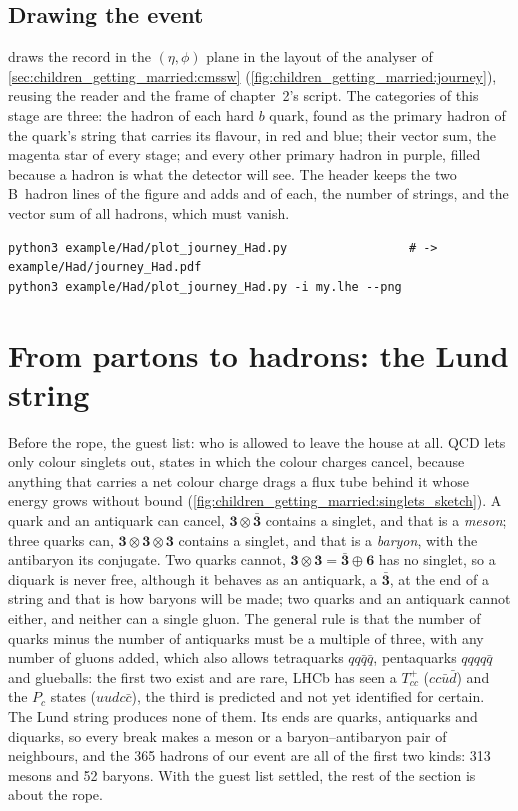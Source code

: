 \subsection{Drawing the event}

 draws the record in the $(\eta,\phi)$
plane in the layout of the \CMSSW analyser of
\cref{sec:children_getting_married:cmssw} (\cref{fig:children_getting_married:journey}),
reusing the reader and the frame of chapter~2's script. The categories of
this stage are three: the hadron of each hard $b$ quark, found as the
primary hadron of the quark's string that carries its flavour, in red and
blue; their vector sum, the magenta star of every stage; and every other
primary hadron in purple, filled because a hadron is what the detector will
see. The header keeps the two B~hadron lines of the \CMSSW figure and adds
\xE and \xpt of each, the number of strings, and the vector sum of all
hadrons, which must vanish.
\begin{verbatim}
python3 example/Had/plot_journey_Had.py                 # -> example/Had/journey_Had.pdf
python3 example/Had/plot_journey_Had.py -i my.lhe --png
\end{verbatim}

\section{From partons to hadrons: the Lund string}
\label{sec:children_getting_married:from_partons_to_hadrons_the_lund_string}

Before the rope, the guest list: who is allowed to leave the house at all.
QCD lets only colour singlets out, states in which the colour charges
cancel, because anything that carries a net colour charge drags a flux
tube behind it whose energy grows without bound
(\cref{fig:children_getting_married:singlets_sketch}). A quark and an
antiquark can cancel, $\mathbf3\otimes\bar{\mathbf3}$ contains a singlet,
and that is a \emph{meson}; three quarks can, $\mathbf3\otimes\mathbf3\otimes\mathbf3$
contains a singlet, and that is a \emph{baryon}, with the antibaryon its
conjugate. Two quarks cannot, $\mathbf3\otimes\mathbf3=\bar{\mathbf3}\oplus\mathbf6$
has no singlet, so a diquark is never free, although it behaves as an
antiquark, a $\bar{\mathbf3}$, at the end of a string and that is how
baryons will be made; two quarks and an antiquark cannot either, and
neither can a single gluon. The general rule is that the number of quarks
minus the number of antiquarks must be a multiple of three, with any
number of gluons added, which also allows tetraquarks $qq\bar q\bar q$,
pentaquarks $qqqq\bar q$ and glueballs: the first two exist and are rare,
LHCb has seen a $T_{cc}^+$ ($cc\bar u\bar d$) and the $P_c$ states
($uudc\bar c$), the third is predicted and not yet identified for certain.
The Lund string produces none of them. Its ends are quarks, antiquarks and
diquarks, so every break makes a meson or a baryon--antibaryon pair of
neighbours, and the 365 hadrons of our event are all of the first two
kinds: 313 mesons and 52 baryons. With the guest list settled, the rest of
the section is about the rope.

